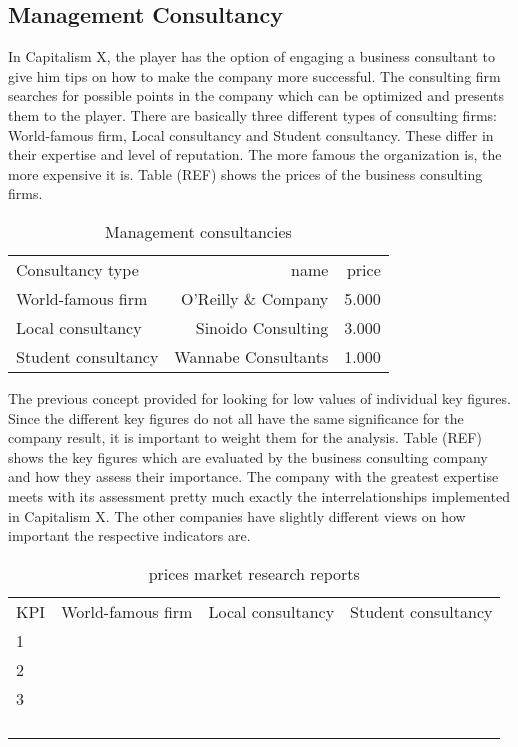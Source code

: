 \subsection{Management Consultancy}
In Capitalism X, the player has the option of engaging a business consultant to give him tips on how to make the company more successful. 
The consulting firm searches for possible points in the company which can be optimized and presents them to the player.
There are basically three different types of consulting firms: World-famous firm, Local consultancy and Student consultancy. These differ in their expertise and level of reputation. The more famous the organization is, the more expensive it is. Table (REF) shows the prices of the business consulting firms.

\begin{table}[ht]
\centering
\begin{tabular}{|l|r|r|}
\hline
Consultancy type        & name  & price \\
World-famous firm       & O'Reilly \& Company     & 5.000     \\
Local consultancy       & Sinoido Consulting     & 3.000     \\
Student consultancy     & Wannabe Consultants    & 1.000     \\
\hline
\end{tabular}
\caption{Management consultancies}
\label{mng_consultancy}
\end{table}

The previous concept provided for looking for low values of individual key figures. Since the different key figures do not all have the same significance for the company result, it is important to weight them for the analysis.
Table (REF) shows the key figures which are evaluated by the business consulting company and how they assess their importance.
The company with the greatest expertise meets with its assessment pretty much exactly the interrelationships implemented in Capitalism X. The other companies have slightly different views on how important the respective indicators are. 
 
\begin{table}[ht]
\centering
\begin{tabular}{|l|r|r|r|}
\hline
KPI       & World-famous firm    & Local consultancy    & Student consultancy  \\
1         &      &     &     \\
2         &      &     &     \\
3         &      &     &     \\
    &      &     &     \\
    &      &     &     \\
    &      &     &     \\
    &      &     &     \\
\hline
\end{tabular}
\caption{prices market research reports}
\label{MR_report_price}
\end{table}

